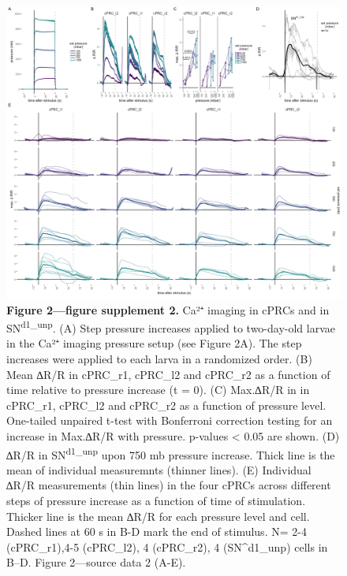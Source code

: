 \documentclass[
  11pt,
]{article}
\begin{document}
\begin{figure}[H]

{\centering \includegraphics[width=1\textwidth,height=\textheight]{Figures/Figure2-FigureSupplement2.png}

}

\caption{\textbf{Figure 2---figure supplement 2. } Ca²⁺ imaging in cPRCs
and in SN\textsuperscript{d1\_unp}. (A) Step pressure increases applied
to two-day-old larvae in the Ca²⁺ imaging pressure setup (see Figure
2A). The step increases were applied to each larva in a randomized
order. (B) Mean ∆R/R in cPRC\_r1, cPRC\_l2 and cPRC\_r2 as a function of
time relative to pressure increase (t = 0). (C) Max.∆R/R in in cPRC\_r1,
cPRC\_l2 and cPRC\_r2 as a function of pressure level. One-tailed
unpaired t-test with Bonferroni correction testing for an increase in
Max.∆R/R with pressure. p-values \textless{} 0.05 are shown. (D) ∆R/R in
SN\textsuperscript{d1\_unp} upon 750 mb pressure increase. Thick line is
the mean of individual measuremnts (thinner lines). (E) Individual ∆R/R
measurements (thin lines) in the four cPRCs across different steps of
pressure increase as a function of time of stimulation. Thicker line is
the mean ∆R/R for each pressure level and cell. Dashed lines at 60 s in
B-D mark the end of stimulus. N= 2-4 (cPRC\_r1),4-5 (cPRC\_l2), 4
(cPRC\_r2), 4 (SN\^{}d1\_unp) cells in B--D. Figure 2---source data 2
(A-E).}

\end{figure}%
\end{document}
